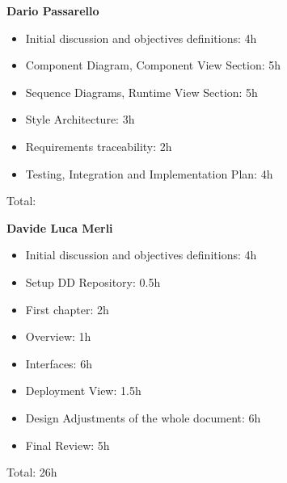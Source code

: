 \textbf{Dario Passarello}
\begin{itemize}
    \item Initial discussion and objectives definitions: 4h
    \item Component Diagram, Component View Section: 5h
    \item Sequence Diagrams, Runtime View Section: 5h
    \item Style Architecture: 3h
    \item Requirements traceability: 2h
    \item Testing, Integration and Implementation Plan: 4h
\end{itemize}

Total:

\bigskip

\textbf{Davide Luca Merli}

\begin{itemize}
    \item Initial discussion and objectives definitions: 4h
    \item Setup DD Repository: 0.5h
    \item First chapter: 2h
    \item Overview: 1h
    \item Interfaces: 6h
    \item Deployment View: 1.5h
    \item Design Adjustments of the whole document: 6h
    \item Final Review: 5h

\end{itemize}

Total: 26h